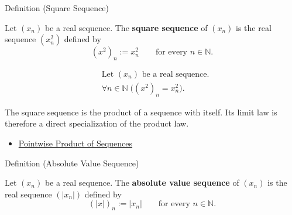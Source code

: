 
\begin{definitionbox}{Definition (Square Sequence)}
\begin{definition}
\label{def:square-sequence}
Let $(x_n)$ be a real sequence. The \textbf{square sequence} of $(x_n)$ is
the real sequence $(x_n^2)$ defined by
\[
(x^2)_n := x_n^2
\qquad
\text{for every } n\in\mathbb{N}.
\]
\end{definition}
\end{definitionbox}

\begin{remark*}
\[
\begin{aligned}
&\text{Let } (x_n) \text{ be a real sequence.}\\
&\forall n\in\mathbb{N}\;\bigl((x^2)_n=x_n^2\bigr).
\end{aligned}
\]
\end{remark*}

\begin{remark*}[Interpretation]
The square sequence is the product of a sequence with itself. Its limit law is
therefore a direct specialization of the product law.
\end{remark*}

\begin{dependencies}
\begin{itemize}
  \item \hyperref[def:pointwise-product-sequence]{Pointwise Product of Sequences}
\end{itemize}
\end{dependencies}


\begin{definitionbox}{Definition (Absolute Value Sequence)}
\begin{definition}
\label{def:absolute-value-sequence}
Let $(x_n)$ be a real sequence. The \textbf{absolute value sequence} of
$(x_n)$ is the real sequence $(|x_n|)$ defined by
\[
(|x|)_n := |x_n|
\qquad
\text{for every } n\in\mathbb{N}.
\]
\end{definition}
\end{definitionbox}

